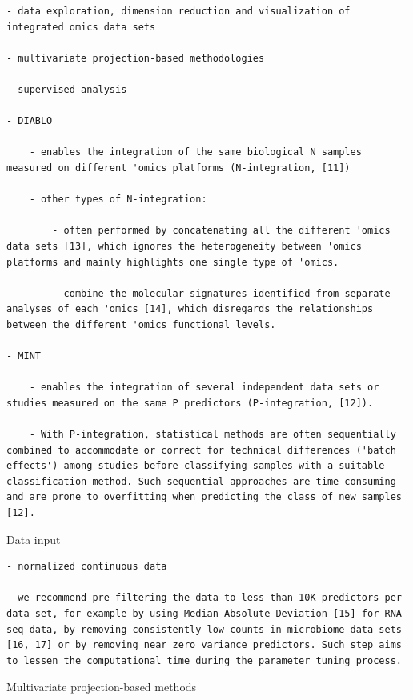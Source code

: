 \documentclass[
]{book}
\begin{document}
\begin{verbatim}
- data exploration, dimension reduction and visualization of integrated omics data sets

- multivariate projection-based methodologies

- supervised analysis

- DIABLO

    - enables the integration of the same biological N samples measured on different 'omics platforms (N-integration, [11])

    - other types of N-integration:

        - often performed by concatenating all the different 'omics data sets [13], which ignores the heterogeneity between 'omics platforms and mainly highlights one single type of 'omics.

        - combine the molecular signatures identified from separate analyses of each 'omics [14], which disregards the relationships between the different 'omics functional levels.

- MINT

    - enables the integration of several independent data sets or studies measured on the same P predictors (P-integration, [12]).

    - With P-integration, statistical methods are often sequentially combined to accommodate or correct for technical differences ('batch effects') among studies before classifying samples with a suitable classification method. Such sequential approaches are time consuming and are prone to overfitting when predicting the class of new samples [12].
\end{verbatim}

Data input

\begin{verbatim}
- normalized continuous data

- we recommend pre-filtering the data to less than 10K predictors per data set, for example by using Median Absolute Deviation [15] for RNA-seq data, by removing consistently low counts in microbiome data sets [16, 17] or by removing near zero variance predictors. Such step aims to lessen the computational time during the parameter tuning process.
\end{verbatim}

Multivariate projection-based methods
\end{document}
